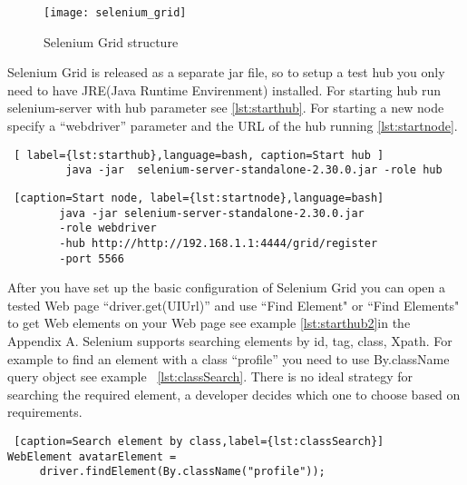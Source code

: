 		\begin{figure}
		\centering
  		\texttt{[image: selenium\_grid]}
  		\caption{Selenium Grid structure}
		\label{fig:selnium_grid}
		\end{figure}
		
		Selenium Grid is released as a separate jar file, so to setup a test hub you
		only need to have JRE(Java Runtime Envirenment) installed. For starting hub
		run selenium-server with hub parameter see \ref{lst:starthub}. For starting
		a new node specify a ``webdriver'' parameter and the URL of the hub running
		\ref{lst:startnode}.
		
		\begin{lstlisting} [ label={lst:starthub},language=bash, caption=Start hub ]
		 java -jar	selenium-server-standalone-2.30.0.jar -role hub
		\end{lstlisting}

		\begin{lstlisting} [caption=Start node, label={lst:startnode},language=bash]
		java -jar selenium-server-standalone-2.30.0.jar 
		-role webdriver
		-hub http://http://192.168.1.1:4444/grid/register
		-port 5566
		\end{lstlisting}
		

	After you have set up the basic configuration of Selenium Grid you can open a
	tested Web page ``driver.get(UIUrl)'' and use ``Find Element" or ``Find
	Elements" to get Web elements on your Web page see example
	\ref{lst:starthub2}in the Appendix A. 
	 Selenium  supports searching elements by id, tag, class, Xpath.
	 For example to find an element with a class ``profile'' you need to use
	 By.className query object see example ~\ref{lst:classSearch}. There is no
	  ideal strategy for searching the required element, a developer
	decides which one to choose based on requirements.
	
	\lstset{style=a1listing}
	\begin{lstlisting} [caption=Search element by class,label={lst:classSearch}]
WebElement avatarElement = 
	 driver.findElement(By.className("profile"));
	\end{lstlisting}